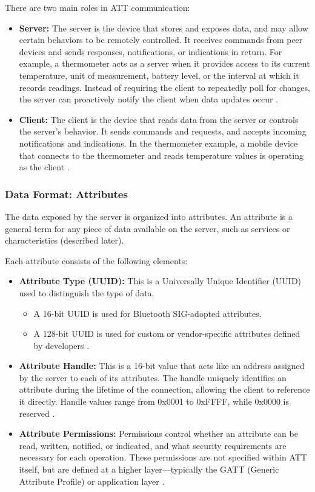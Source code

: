 There are two main roles in ATT communication:
\begin{itemize}
    \item \textbf{Server:} The server is the device that stores and exposes data, and may allow certain behaviors to be remotely controlled. It receives commands from peer devices and sends responses, notifications, or indications in return. For example, a thermometer acts as a server when it provides access to its current temperature, unit of measurement, battery level, or the interval at which it records readings. Instead of requiring the client to repeatedly poll for changes, the server can proactively notify the client when data updates occur \cite{introtoble}.
    \item \textbf{Client:} The client is the device that reads data from the server or controls the server's behavior. It sends commands and requests, and accepts incoming notifications and indications. In the thermometer example, a mobile device that connects to the thermometer and reads temperature values is operating as the client \cite{introtoble}.
\end{itemize}

\subsubsection{Data Format: Attributes}

The data exposed by the server is organized into attributes. An attribute is a general term for any piece of data available on the server, such as services or characteristics (described later).

Each attribute consists of the following elements:
\begin{itemize}
    \item \textbf{Attribute Type (UUID):} This is a Universally Unique Identifier (UUID) used to distinguish the type of data.
    \begin{itemize}
        \item A 16-bit UUID is used for Bluetooth SIG-adopted attributes.
        \item A 128-bit UUID is used for custom or vendor-specific attributes defined by developers \cite{introtoble}.
    \end{itemize}
    \item \textbf{Attribute Handle:} This is a 16-bit value that acts like an address assigned by the server to each of its attributes. The handle uniquely identifies an attribute during the lifetime of the connection, allowing the client to reference it directly. Handle values range from 0x0001 to 0xFFFF, while 0x0000 is reserved \cite{introtoble}.
    \item \textbf{Attribute Permissions:} Permissions control whether an attribute can be read, written, notified, or indicated, and what security requirements are necessary for each operation. These permissions are not specified within ATT itself, but are defined at a higher layer—typically the GATT (Generic Attribute Profile) or application layer \cite{introtoble}.
\end{itemize}
